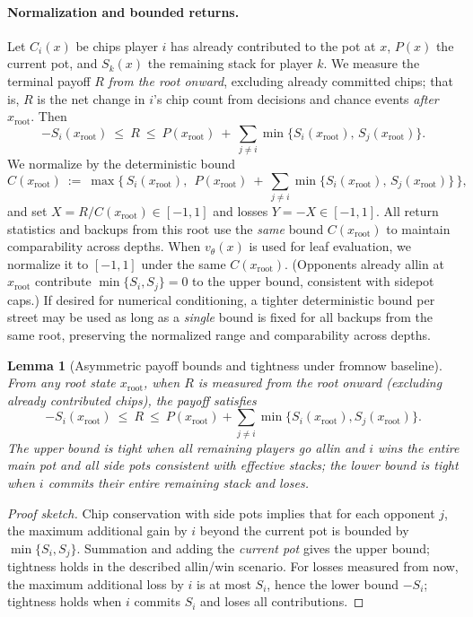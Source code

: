 \documentclass[10pt]{article}
\newcommand{\1}{\mathbf{1}}
\theoremstyle{plain}
\newtheorem{lemma}{Lemma}
\begin{document}
\paragraph{Normalization and bounded returns.}
Let $C_i(x)$ be chips player $i$ has already contributed to the pot at $x$, $P(x)$ the current pot, and $S_k(x)$ the remaining stack for player $k$. We measure the terminal payoff $R$ \emph{from the root onward}, excluding already committed chips; that is, $R$ is the net change in $i$'s chip count from decisions and chance events \emph{after} $x_{\mathrm{root}}$. Then
\[
-S_i(x_{\mathrm{root}})\ \le\ R\ \le\ P(x_{\mathrm{root}})\ +\ \sum_{j\neq i} \min\{S_i(x_{\mathrm{root}}),\,S_j(x_{\mathrm{root}})\}.
\]
We normalize by the deterministic bound
\begin{equation}
\label{eq:normC}
C(x_{\mathrm{root}})\ :=\ \max\!\Big\{\,S_i(x_{\mathrm{root}}),\ \ P(x_{\mathrm{root}})\ +\ \sum_{j\neq i} \min\{S_i(x_{\mathrm{root}}),\,S_j(x_{\mathrm{root}})\}\,\Big\},
\end{equation}
and set $X=R/C(x_{\mathrm{root}})\in[-1,1]$ and losses $Y=-X\in[-1,1]$. All return statistics and backups from this root use the \emph{same} bound $C(x_{\mathrm{root}})$ to maintain comparability across depths. When $v_\theta(x)$ is used for leaf evaluation, we normalize it to $[-1,1]$ under the same $C(x_{\mathrm{root}})$. (Opponents already all\textendash in at $x_{\mathrm{root}}$ contribute $\min\{S_i,S_j\}=0$ to the upper bound, consistent with side\textendash pot caps.) If desired for numerical conditioning, a tighter deterministic bound per street may be used as long as a \emph{single} bound is fixed for all backups from the same root, preserving the normalized range and comparability across depths.

\begin{lemma}[Asymmetric payoff bounds and tightness under from\textendash now baseline]
\label{lem:bound}
From any root state $x_{\mathrm{root}}$, when $R$ is measured from the root onward (excluding already contributed chips), the payoff satisfies
\[
-S_i(x_{\mathrm{root}})\ \le\ R\ \le\ P(x_{\mathrm{root}})+\sum_{j\neq i}\min\{S_i(x_{\mathrm{root}}),S_j(x_{\mathrm{root}})\}.
\]
The upper bound is tight when all remaining players go all\textendash in and $i$ wins the entire main pot and all side pots consistent with effective stacks; the lower bound is tight when $i$ commits their entire remaining stack and loses.
\end{lemma}
\begin{proof}[Proof sketch]
Chip conservation with side pots implies that for each opponent $j$, the maximum additional gain by $i$ beyond the current pot is bounded by $\min\{S_i,S_j\}$. Summation and adding the \emph{current pot} gives the upper bound; tightness holds in the described all\textendash in/win scenario. For losses measured from now, the maximum additional loss by $i$ is at most $S_i$, hence the lower bound $-S_i$; tightness holds when $i$ commits $S_i$ and loses all contributions.
\end{proof}
\end{document}
